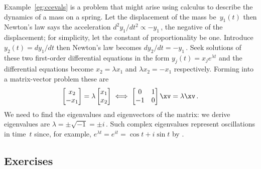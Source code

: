 Example~\ref{eg:ccevals} is a problem that might arise using calculus to describe the dynamics of a mass on a spring.  
Let the displacement of the mass be~\(y_1(t)\) then Newton's law says the acceleration \(d^2y_1/dt^2\propto -y_1\)\,, the negative of the displacement; for simplicity, let the constant of proportionality be one.  
Introduce \(y_2(t)=dy_1/dt\) then Newton's law becomes \(dy_2/dt=-y_1\)\,.  
Seek solutions of these two first-order differential equations in the form \(y_j(t)=x_je^{\lambda t}\) and the differential equations become \(x_2=\lambda x_1\) and \(\lambda x_2=-x_1\) respectively.  
Forming into a matrix-vector problem these are
\begin{equation*}
\begin{bmatrix} x_2\\-x_1 \end{bmatrix}
=\lambda\begin{bmatrix} x_1\\x_2 \end{bmatrix}
\iff
\begin{bmatrix} 0&1\\-1&0 \end{bmatrix}\xv=\lambda\xv\,.
\end{equation*}
We need to find the eigenvalues and eigenvectors of the matrix: we derive eigenvalues are \(\lambda=\pm \sqrt{-1}=\pm i\)\,. 
Such complex eigenvalues represent oscillations in time~\(t\) since, for example, \(e^{\lambda t}=e^{it}=\cos t+i\sin t\) by .








\subsection{Exercises}


